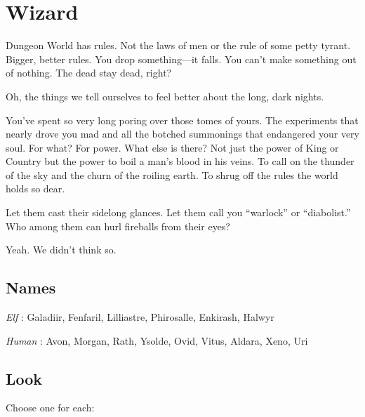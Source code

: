 \chapter{Wizard}
  
            

         

Dungeon World has rules. Not the laws of men or the rule of some petty tyrant. Bigger, better rules. You drop something—it falls. You can’t make something out of nothing. The dead stay dead, right?

         

Oh, the things we tell ourselves to feel better about the long, dark nights.

         

You’ve spent so very long poring over those tomes of yours. The experiments that nearly drove you mad and all the botched summonings that endangered your very soul. For what? For power. What else is there? Not just the power of King or Country but the power to boil a man's blood in his veins. To call on the thunder of the sky and the churn of the roiling earth. To shrug off the rules the world holds so dear.

         

Let them cast their sidelong glances. Let them call you “warlock” or “diabolist.” Who among them can hurl fireballs from their eyes?

         

Yeah. We didn’t think so.

       

       
\section{Names}   
       

         

           {\em Elf} : Galadiir, Fenfaril, Lilliastre, Phirosalle, Enkirash, Halwyr

         

           {\em Human} : Avon, Morgan, Rath, Ysolde, Ovid, Vitus, Aldara, Xeno, Uri

       

       
\section{Look}  
       

         

Choose one for each:

